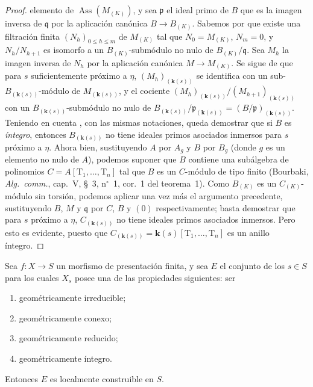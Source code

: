 \begin{proof}
elemento de $\operatorname{Ass}(M_{(K)})$, y sea $\mathfrak{p}$ el ideal primo de $B$ que es la imagen inversa de $\mathfrak{q}$ por la aplicación canónica $B\to B_{(K)}$.
Sabemos por  que existe una filtración finita $(N_h)_{0\leqslant h\leqslant m}$ de $M_{(K)}$ tal que $N_0=M_{(K)}$, $N_m=0$, y $N_h/N_{h+1}$ es isomorfo a un $B_{(K)}$-submódulo no nulo de $B_{(K)}/\mathfrak{q}$.
Sea $M_h$ la imagen inversa de $N_h$ por la aplicación canónica $M\to M_{(K)}$.
Se sigue de  que para $s$ suficientemente próximo a $\eta$, $(M_h)_{(\mathbf{k}(s))}$ se identifica con un sub-$B_{(\mathbf{k}(s))}$-módulo de $M_{(\mathbf{k}(s))}$, y el cociente $(M_h)_{(\mathbf{k}(s))}/(M_{h+1})_{(\mathbf{k}(s))}$ con un $B_{(\mathbf{k}(s))}$-submódulo no nulo de $B_{(\mathbf{k}(s))}/\mathfrak{p}_{(\mathbf{k}(s))}=(B/\mathfrak{p})_{(\mathbf{k}(s))}$.
Teniendo en cuenta , con las mismas notaciones, queda demostrar que si $B$ es \emph{íntegro}, entonces $B_{(\mathbf{k}(s))}$ no tiene ideales primos asociados inmersos para $s$ próximo a $\eta$.
Ahora bien, sustituyendo $A$ por $A_g$ y $B$ por $B_g$ (donde $g$ es un elemento no nulo de $A$), podemos suponer que $B$ contiene una subálgebra de polinomios $C=A[\mathrm{T}_1,\ldots,\mathrm{T}_n]$ tal que $B$ es un $C$-módulo de tipo finito (Bourbaki, \emph{Alg.\ comm.}, cap.\ V, \S~3, n$^\circ$~1, cor.\ 1 del teorema\ 1).
Como $B_{(K)}$ es un $C_{(K)}$-módulo sin torsión, podemos aplicar una vez más el argumento precedente, sustituyendo $B$, $M$ y $\mathfrak{q}$ por $C$, $B$ y $(0)$ respectivamente; basta demostrar que para $s$ próximo a $\eta$, $C_{(\mathbf{k}(s))}$ no tiene ideales primos asociados inmersos.
Pero esto es evidente, puesto que $C_{(\mathbf{k}(s))}=\boldsymbol{k}(s)[\mathrm{T}_1,\ldots,\mathrm{T}_n]$ es un anillo íntegro.
\end{proof}

\begin{theorem}[9.7.7]
\label{IV.9.7.7}
Sea $f:X\to S$ un morfismo de presentación finita, y sea $E$ el conjunto de los $s\in S$ para los cuales $X_s$ posee una de las propiedades siguientes: ser
\begin{enumerate}[label=\textup{(\roman*)}]
  \item geométricamente irreducible;
  \item geométricamente conexo;
  \item geométricamente reducido;
  \item geométricamente íntegro.
\end{enumerate}
Entonces $E$ es localmente construible en $S$.
\end{theorem}

